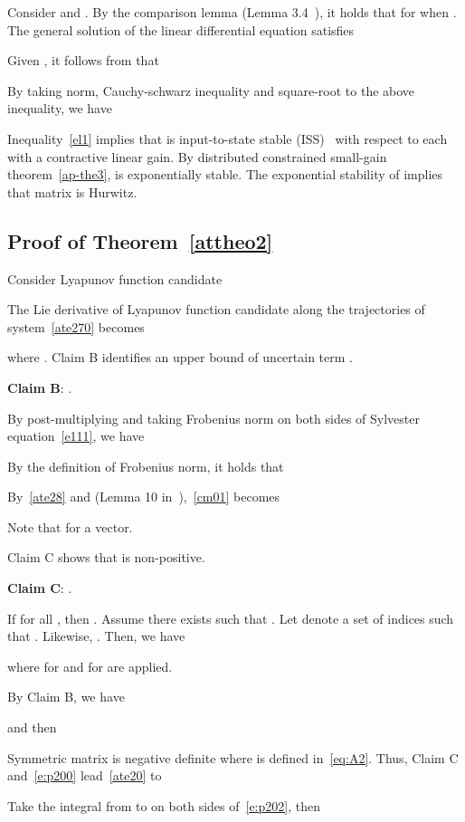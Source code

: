 \documentclass[journal]{IEEEtran}
\newcommand\oprocendsymbol{\hbox{}}
\newcommand\oprocend{\relax\ifmmode\else\unskip\hfill\fi\oprocendsymbol}
\begin{document}
Consider  and .
By the comparison lemma (Lemma 3.4~\cite{Khalil:02}), it holds that 
for  when .
The general solution  of the linear differential equation satisfies

Given , it follows from  that

By taking norm, Cauchy-schwarz inequality and square-root to the above inequality, we have

Inequality~\eqref{el1} implies that  is input-to-state stable (ISS)~\cite{sontag1989smooth} with respect to each  with a contractive linear gain.
By distributed constrained small-gain theorem~\ref{ap-the3},  is exponentially stable.
The exponential stability of  implies that matrix  is Hurwitz.
\oprocend

\subsection{Proof of Theorem~\ref{attheo2}}
Consider Lyapunov function candidate

The Lie derivative of Lyapunov function candidate along the trajectories of system~\eqref{ate270} becomes

where .
Claim B identifies an upper bound of uncertain term .

\textbf{Claim B}: 
.
\begin{IEEEproof}
By post-multiplying  and taking Frobenius norm on both sides of Sylvester equation~\eqref{e111}, we have

By the definition of Frobenius norm, it holds that

By~\eqref{ate28} and  (Lemma 10 in~\cite{srebro2004learning}),~\eqref{cm01} becomes

Note that  for a vector.
\end{IEEEproof}

Claim C shows that  is non-positive.

\textbf{Claim C}: .
\begin{IEEEproof}
If  for all , then . Assume there exists  such that .
Let  denote a set of indices  such that . Likewise, .
Then, we have

where  for  and  for  are applied.
\end{IEEEproof}

By Claim B, we have 

and then

Symmetric matrix  is negative definite where  is defined in~\eqref{eq:A2}.
Thus, Claim C and~\eqref{e:p200} lead~\eqref{ate20} to 

Take the integral from  to  on both sides of~\eqref{e:p202}, then
\end{document}
